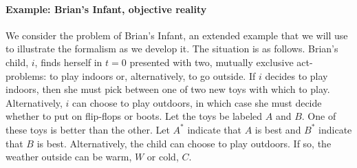 \documentclass[
11pt,
titlepage,
reqno,
]{article}%
\theoremstyle{definition}
\begin{document}
	
	
\paragraph{Example: Brian's Infant, objective reality}	
We consider the problem of Brian's Infant, an extended example that we will use  to illustrate the formalism as we develop it.
The situation is as follows.
Brian's child, $i$, finds herself in $t=0$ presented with two, mutually exclusive act-problems: to play indoors or, alternatively, to go outside. 
If $i$ decides to play indoors, then she must pick between one of two new toys with which to play.
Alternatively, $i$ can choose to play outdoors, in which case she must decide whether to put on flip-flops or boots.
Let the toys be labeled $A$ and $B$. 
One of these toys is better than the other. 
Let $A^\ast$ indicate that $A$ is best and $B^\ast$ indicate that $B$ is best. 
Alternatively, the child can choose to play outdoors.
If so,  the weather outside can be warm, $W$ or cold, $C$.

\end{document}
